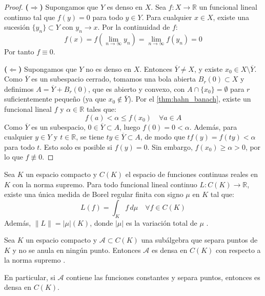 \begin{proof}
	\textbf{(\(\Rightarrow\))} Supongamos que $Y$ es denso en $X$. Sea $f: X \to \mathbb{R}$ un funcional lineal continuo tal que $f(y) = 0$ para todo $y \in Y$. Para cualquier $x \in X$, existe una sucesión $\{y_n\} \subset Y$ con $y_n \to x$. Por la continuidad de $f$:
	\[
		f(x) = f\!\left(\lim_{n \to \infty} y_n\right) = \lim_{n \to \infty} f(y_n) = 0
	\]
	Por tanto $f \equiv 0$.

	\textbf{(\(\Leftarrow\))} Supongamos que $Y$ no es denso en $X$. Entonces $\overline{Y} \neq X$, y existe $x_0 \in X \setminus \overline{Y}$. Como $\overline{Y}$ es un subespacio cerrado, tomamos una bola abierta $B_r(0) \subset X$ y definimos $A = \overline{Y} + B_r(0)$, que es abierto y convexo, con $A \cap \{x_0\} = \emptyset$ para $r$ suficientemente pequeño (ya que $x_0 \notin \overline{Y}$). Por el \autoref{thm:hahn_banach}, existe un funcional lineal $f$ y $\alpha \in \mathbb{R}$ tales que:
	\[
		f(a) < \alpha \leq f(x_0) \quad \forall a \in A
	\]
	Como $\overline{Y}$ es un subespacio, $0 \in \overline{Y} \subset A$, luego $f(0) = 0 < \alpha$. Además, para cualquier $y \in Y$ y $t \in \mathbb{R}$, se tiene $ty \in \overline{Y} \subset A$, de modo que $tf(y) = f(ty) < \alpha$ para todo $t$. Esto solo es posible si $f(y) = 0$. Sin embargo, $f(x_0) \geq \alpha > 0$, por lo que $f \not\equiv 0$.
\end{proof}

\begin{theorem}\label{thm:riesz_representacion}
	Sea \(K\) un espacio compacto y \(C(K)\) el espacio de funciones continuas reales en \(K\) con la norma supremo. Para todo funcional lineal continuo \(L: C(K) \to \mathbb{R}\), existe una única medida de Borel regular finita con signo \(\mu\) en \(K\) tal que:
	\[
		L(f) = \int_K f \, d\mu \quad \forall f \in C(K)
	\]
	Además, \(\|L\| = |\mu|(K)\), donde \(|\mu|\) es la variación total de \(\mu\) \citep[Teorema~7.17]{Folland1999}.
\end{theorem}

\begin{theorem}\label{thm:stone_weierstrass}
	Sea \(K\) un espacio compacto y \(\mathcal{A} \subset C(K)\) una subálgebra que separa puntos de \(K\) y no se anula en ningún punto. Entonces \(\mathcal{A}\) es densa en \(C(K)\) con respecto a la norma supremo \citep[Teorema~7.32]{Rudin1976}.
\end{theorem}

En particular, si \(\mathcal{A}\) contiene las funciones constantes y separa puntos, entonces es densa en \(C(K)\).

